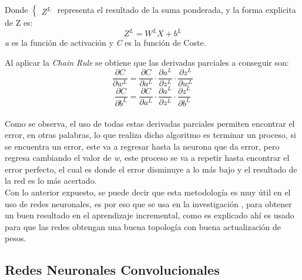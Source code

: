             Donde 
            $\begin{cases}
                Z^L
            \end{cases}$
            representa el resultado de la suma ponderada, y la forma explicita de Z es:
            \begin{equation*}
                Z^L = W^LX + b^L
            \end{equation*}
            \textit{a} es la funci\'on de activaci\'on 
            y \textit{C} es la funci\'on de Coste.

            Al aplicar la \textit{Chain Rule} se obtiene que las derivadas parciales a conseguir son:
            \begin{equation*}
                \frac{\partial C}{\partial w^L} = \frac{\partial C}{\partial a^L} \cdot \frac{\partial a^L}{\partial z^L} \cdot \frac{\partial z^L}{\partial w^L} 
            \end{equation*}
            \begin{equation*}
                \frac{\partial C}{\partial b^L} = \frac{\partial C}{\partial a^L} \cdot \frac{\partial a^L}{\partial z^L} \cdot \frac{\partial z^L}{\partial b^L}
            \end{equation*}
            \\

            Como se observa, el uso de todas estas derivadas parciales permiten encontrar el error, en otras palabras, lo que realiza dicho algoritmo es terminar un proceso, si se encuentra un error, este va a regresar
            hasta la neurona que da error, pero regresa cambiando el valor de \textit{w}, este proceso se va a 
            repetir hasta encontrar el error perfecto, el cual es donde el error disminuye a lo m\'as bajo y el resultado
            de la red es lo m\'as acertado.\\

            Con lo anterior expuesto, se puede decir
            que esta metodolog\'ia es muy \'util en el uso de redes neuronales, es por eso que 
            se usa en la investigaci\'on \cite{bullinaria2009}, para obtener un buen resultado
            en el aprendizaje incremental, como es explicado ah\'i es usado para que las redes obtengan una buena topolog\'ia con 
            buena actualizaci\'on de pesos.

        \subsection{Redes Neuronales Convolucionales}
        	
